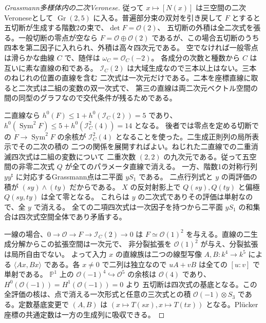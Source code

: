\begin{proof}[Grassmann多様体内の二次Veronese]
従って $x\mapsto[N(x)]$ は三空間の二次Veroneseとして
$\operatorname{Gr}(2,5)$ に入る。普遍部分束の双対を引き戻して $F$ とすると
五切断が生成する階数2の束で、$\det F=\mathcal O(2)$、
五切断の外積は全二次式を張る。一般切断の零点が空なら $F=\mathcal O\oplus\mathcal O(2)$
であるが、この場合五切断のうち四本を第二因子に入れられ、外積は高々四次元である。
空でなければ一般零点は滑らかな曲線 $C$ で、随伴は $\omega_C=\mathcal O_C(-2)$。
各成分の次数と種数から $C$ は互いに素な直線の和である。
$\mathcal I_C(2)$ は大域生成なので三本以上はない。三本のねじれの位置の直線を含む
二次式は一次元だけである。二本を座標直線に取ると二次式は二組の変数の双一次式で、
第三の直線は両二次元ベクトル空間の間の同型のグラフなので交代条件が残るためである。

二直線なら $h^0(F)\le1+h^0(\mathcal I_C(2))=5$ であり、
$h^0(\operatorname{Sym}^2 F)\le5+h^0(\mathcal I_C^2(4))=14$ となる。
後者では零点を定める切断での $F\to\operatorname{Sym}^2F$ の余核が
$\mathcal I_C^2(4)$ となることを使った。二生成正則列の局所表示でその二次の積の
二つの関係を展開すればよい。ねじれた二直線での二重消滅四次式は二組の変数について
二重次数 $(2,2)$ の九次元である。従って五空間の非零二次式 $Q$ が全てのパラメータ直線で消える。
一方、階数1の対称行列 $yy^{\mathsf t}$ に対応するGrassmann点は二平面 $yS_1$ である。
二点行列式と $y$ の両評価の積が $(sy)\wedge(ty)$ だからである。
$X$ の反対射影上で $Q(sy),Q(ty)$ と偏極 $Q(sy,ty)$ は全て零となる。
これらは $y$ の二次式でありその評価は単射なので、全 $y$ で消える。
全ての二項四次式は一次因子を持つから二平面 $yS_1$ の和集合は四次式空間全体であり矛盾する。

一線の場合、$0\to\mathcal O\to F\to\mathcal I_C(2)\to0$ は
$F\simeq\mathcal O(1)^2$ を与える。直線の二生成分解からこの拡張空間は一次元で、
非分裂拡張を $\mathcal O(1)^2$ が与え、分裂拡張は局所自由でない。
よって入力 $x$ の直線族は二つの線型写像 $A,B:k^4\to k^5$ による
$\langle Ax,Bx\rangle$ である。各 $x\ne0$ で二列は独立なので
$uA+vB$ は全ての $[u:v]$ で単射である。
$\mathbb P^1$ 上の $\mathcal O(-1)^4\hookrightarrow\mathcal O^5$ の余核は
$\mathcal O(4)$ であり、$H^0(\mathcal O(-1))=H^1(\mathcal O(-1))=0$ より
五切断は四次式の基底となる。この全評価の核は、点で消える一次形式と任意の三次式との積
$\mathcal O(-1)\otimes S_3$ である。定数基底変更で $(A,B)$ は
$(x\mapsto T(sx),x\mapsto T(tx))$ となる。Plücker座標の共通定数は一方の生成列に吸収できる。
\end{proof}

